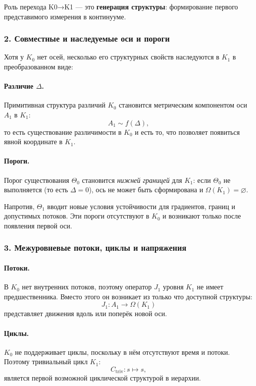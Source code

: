 Роль перехода K0→K1 — это \textbf{генерация структуры}: формирование
первого представимого измерения в континууме.

\subsubsection{2. Совместные и наследуемые оси и пороги}

Хотя у $K_0$ нет осей, несколько его структурных свойств наследуются
в $K_1$ в преобразованном виде:

\paragraph{Различие \texorpdfstring{$\Delta$}{\Delta}.}
Примитивная структура различий $K_0$ становится метрическим компонентом оси
$A_1$ в $K_1$:
\[
A_1 \sim f(\Delta),
\]
то есть существование различимости в $K_0$ и есть то, что позволяет
появиться явной координате в $K_1$.

\paragraph{Пороги.}
Порог существования $\Theta_0$ становится \emph{нижней границей} для $K_1$:
если $\Theta_0$ не выполняется (то есть $\Delta=0$), ось не может быть
сформирована и $\Omega(K_1)=\varnothing$.

Напротив, $\Theta_1$ вводит новые условия устойчивости для градиентов,
границ и допустимых потоков. Эти пороги отсутствуют в $K_0$ и
возникают только после появления первой оси.

\subsubsection{3. Межуровневые потоки, циклы и напряжения}

\paragraph{Потоки.}
В $K_0$ нет внутренних потоков, поэтому оператор $J_1$ уровня $K_1$ не имеет
предшественника. Вместо этого он возникает из только что доступной
структуры:
\[
J_1 : A_1 \rightarrow \Omega(K_1)
\]
представляет движения вдоль или поперёк новой оси.

\paragraph{Циклы.}
$K_0$ не поддерживает циклы, поскольку в нём отсутствуют время и потоки.
Поэтому тривиальный цикл $K_1$:
\[
C_{\mathrm{triv}} : s \mapsto s,
\]
является первой возможной циклической структурой в иерархии.

